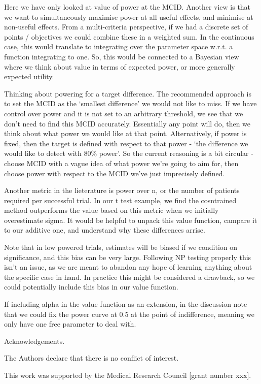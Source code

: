 \documentclass[sagev, Crown]{sagej}
\begin{document}
Here we have only looked at value of power at the MCID. Another view is that we want to simultaneously maximise power at all useful effects, and minimise at non-useful effects. From a multi-criteria perspective, if we had a discrete set of points / objectives we could combine these in a weighted sum. In the continuous case, this would translate to integrating over the parameter space w.r.t. a function integrating to one. So, this would be connected to a Bayesian view where we think about value in terms of expected power, or more generally expected utility. 

Thinking about powering for a target difference. The recommended approach is to set the MCID as the `smallest difference' we would not like to miss. If we have control over power and it is not set to an arbitrary threshold, we see that we don't need to find this MCID accurately. Essentially any point will do, then we think about what power we would like at that point. Alternatively, if power is fixed, then the target is defined with respect to that power - `the difference we would like to detect with 80\% power'. So the current reasoning is a bit circular - choose MCID with a vague idea of what power we're going to aim for, then choose power with respect to the MCID we've just imprecisely defined.

Another metric in the lieterature is power over n, or the number of patients required per successful trial. In our t test example, we find the cosntrained method outperforms the value based on this metric when we initially overestimate sigma. It would be helpful to unpack this value function, campare it to our additive one, and understand why these differences arrise.

Note that in low powered trials, estimates will be biased if we condition on significance, and this bias can be very large. Following NP testing properly this isn't an issue, as we are meant to abandon any hope of learning anything about the specific case in hand. In practice this might be considered a drawback, so we could potentially include this bias in our value function.

If including alpha in the value function as an extension, in the discussion note that we could fix the power curve at 0.5 at the point of indifference, meaning we only have one free parameter to deal with.

\begin{acks}
Acknowledgements.
\end{acks}

\begin{dci}
The Authors declare that there is no conflict of interest.
\end{dci}

\begin{funding}
This work was supported by the Medical Research Council [grant number xxx].
\end{funding}



\end{document}
